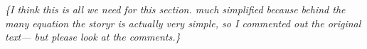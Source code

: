 \documentclass[letterpaper, 10 pt, conference]{ieeeconf}  %
\newcommand{\anote}[1]{{\leavevmode\smaller\itshape\color{red}\{#1\}}}
\begin{document}








\anote{I think this is all we need for this section. much simplified because behind the many equation the storyr is actually very simple, so I commented out the original text--- but please look at the comments.}
%
\end{document}

